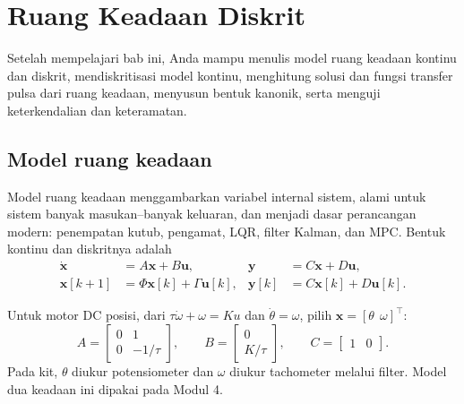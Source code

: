 \chapter{Ruang Keadaan Diskrit}
\label{bab:ss}

\begin{tujuan}
	Setelah mempelajari bab ini, Anda mampu menulis model ruang keadaan kontinu dan diskrit, mendiskritisasi model kontinu, menghitung solusi dan fungsi transfer pulsa dari ruang keadaan, menyusun bentuk kanonik, serta menguji keterkendalian dan keteramatan.
\end{tujuan}

\section{Model ruang keadaan}
Model ruang keadaan menggambarkan variabel internal sistem, alami untuk sistem banyak masukan--banyak keluaran, dan menjadi dasar perancangan modern: penempatan kutub, pengamat, LQR, filter Kalman, dan MPC. Bentuk kontinu dan diskritnya adalah
\begin{align}
	\dot{\mathbf{x}} &= A\mathbf{x} + B\mathbf{u}, & \mathbf{y} &= C\mathbf{x} + D\mathbf{u},\\
	\mathbf{x}[k+1] &= \Phi\mathbf{x}[k] + \Gamma\mathbf{u}[k], & \mathbf{y}[k] &= C\mathbf{x}[k] + D\mathbf{u}[k].
\end{align}

Untuk motor DC posisi, dari $\tau\dot\omega + \omega = Ku$ dan $\dot\theta = \omega$, pilih $\mathbf{x} = [\theta\ \ \omega]^\top$:
\begin{equation}
	A = \begin{bmatrix}0 & 1\\ 0 & -1/\tau\end{bmatrix},\qquad B = \begin{bmatrix}0\\ K/\tau\end{bmatrix},\qquad C = \begin{bmatrix}1 & 0\end{bmatrix}.
\end{equation}
Pada kit, $\theta$ diukur potensiometer dan $\omega$ diukur tachometer melalui filter. Model dua keadaan ini dipakai pada Modul 4.

